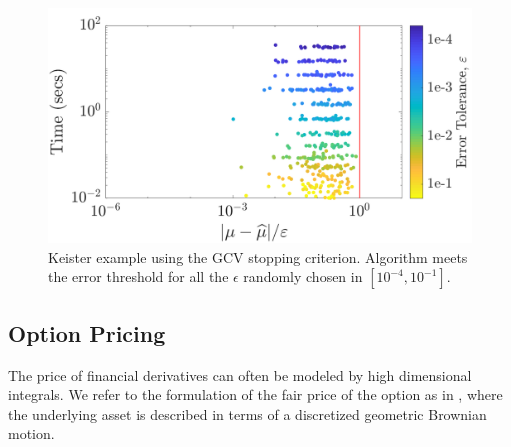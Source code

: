\documentclass[graybox,footinfo]{svmult}
\begin{document}
\begin{figure}
\centering
\includegraphics[width=0.95\linewidth]{"figures/Sobol/Sobol_Keister_guaranteed_time_GCV__d4_r1_2019-Sep-1"}
\caption[Sobol: Keister guaranteed: GCV]{Keister example using the GCV stopping criterion. Algorithm meets the error threshold for all the $\epsilon$ randomly chosen in $[10^{-4}, 10^{-1}]$.}
\label{FJ:fig:Sobol-keister-guaranteed-GCV}
\end{figure}







\subsection{Option Pricing}

The price of financial derivatives can often be modeled by high dimensional integrals. 
We refer to the formulation of the fair price of the option as in \cite{RatHic19a}, where the underlying asset is described in terms of a discretized geometric Brownian motion.

\end{document}
